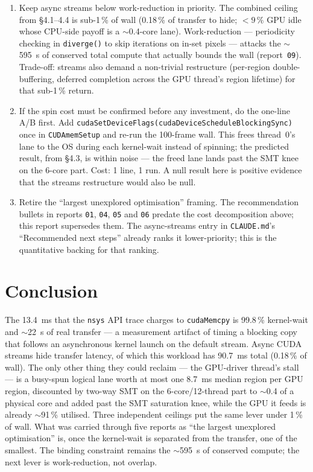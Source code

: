 \documentclass[
	english,
	letterpaper, oneside
]{article}
\begin{document}
\begin{enumerate}
  \item Keep async streams below work-reduction in priority. The
        combined ceiling from \S4.1--4.4 is sub-1\,\% of wall (0.18\,\% of
        transfer to hide; $<9\,\%$ GPU idle whose CPU-side payoff is a
        $\sim$0.4-core lane). Work-reduction --- periodicity checking in
        \texttt{diverge()} to skip iterations on in-set pixels --- attacks the
        $\sim$595~s of conserved total compute that actually bounds the
        wall (report~\texttt{09}). Trade-off: streams also demand a non-trivial
        restructure (per-region double-buffering, deferred completion across the
        GPU thread's region lifetime) for that sub-1\,\% return.
  \item If the spin cost must be confirmed before any investment, do the
        one-line A/B first. Add \texttt{cudaSetDeviceFlags(cudaDeviceSchedule\-BlockingSync)}
        once in \texttt{CUDAmemSetup} and re-run the 100-frame wall. This frees
        thread~0's lane to the OS during each kernel-wait instead of spinning;
        the predicted result, from \S4.3, is within noise --- the freed
        lane lands past the SMT knee on the 6-core part. Cost: 1 line, 1 run. A
        null result here is positive evidence that the streams restructure would
        also be null.
  \item Retire the ``largest unexplored optimisation'' framing. The
        recommendation bullets in reports \texttt{01}, \texttt{04}, \texttt{05}
        and \texttt{06} predate the cost decomposition above; this report
        supersedes them. The async-streams entry in \texttt{CLAUDE.md}'s
        ``Recommended next steps'' already ranks it lower-priority; this is the
        quantitative backing for that ranking.
\end{enumerate}

\section{Conclusion}

The 13.4~ms that the \texttt{nsys} API trace charges to \texttt{cudaMemcpy} is
99.8\,\% kernel-wait and $\sim$22~\textmu s of real transfer --- a measurement
artifact of timing a blocking copy that follows an asynchronous kernel launch on
the default stream. Async CUDA streams hide transfer latency, of which this
workload has 90.7~ms total (0.18\,\% of wall). The only other thing they could
reclaim --- the GPU-driver thread's stall --- is a busy-spun logical lane worth
at most one 8.7~ms median region per GPU region, discounted by two-way SMT on the
6-core/12-thread part to $\sim$0.4 of a physical core and added past the SMT
saturation knee, while the GPU it feeds is already $\sim$91\,\% utilised. Three
independent ceilings put the same lever under 1\,\% of wall. What was carried
through five reports as ``the largest unexplored optimisation'' is, once the
kernel-wait is separated from the transfer, one of the smallest. The binding
constraint remains the $\sim$595~s of conserved compute; the next lever is
work-reduction, not overlap.
\end{document}
